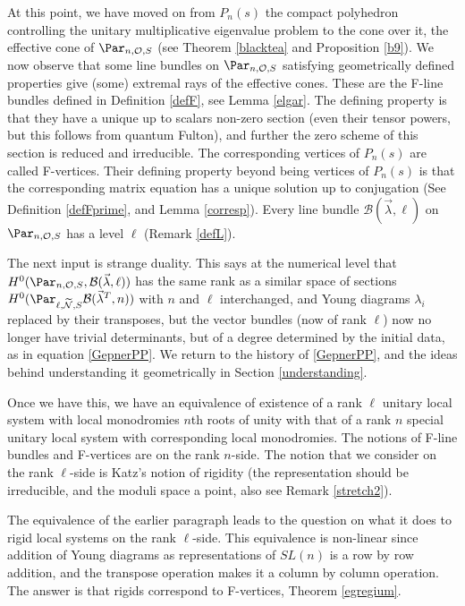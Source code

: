 At this point, we have moved on from $P_n(s)$ the compact polyhedron controlling the unitary multiplicative eigenvalue problem to the cone over it, the effective cone of $\Par_{n,\mathcal{O},S}$ (see Theorem \ref{blacktea} and Proposition \ref{b9}). We now observe that some line bundles on $\Par_{n,\mathcal{O},S}$ satisfying geometrically defined properties give (some) extremal rays of the effective cones. These are the  F-line bundles defined in Definition \ref{defF}, see Lemma \ref{elgar}. The defining property is that they have a unique up to scalars non-zero section (even their tensor powers, but this follows from quantum Fulton), and further the zero scheme of this section is reduced and irreducible. The corresponding vertices of $P_n(s)$ are called F-vertices. Their defining property beyond being vertices of $P_n(s)$ is that the corresponding matrix equation has a unique solution up to  conjugation (See Definition \ref{defFprime}, and Lemma \ref{corresp}). Every line bundle $\mathcal{B}(\vec{\lambda},\ell)$ on $\Par_{n,\mathcal{O},S}$ has a level $\ell$ (Remark \ref{defL}).

The next input is strange duality. This says at the numerical level that $H^0(\Par_{n,\mathcal{O},S},\mathcal{B}(\vec{\lambda},\ell))$ has the same rank as a similar space of sections $H^0(\Par_{\ell,\widetilde{\mathcal{N}},S}\mathcal{B}(\vec{\lambda}^T,n))$ with $n$ and $\ell$ interchanged, and Young diagrams $\lambda_i$ replaced by their transposes, but the vector bundles (now of rank $\ell$)  now no longer have trivial determinants, but of a degree determined by the initial data, as in equation \eqref{GepnerPP}. We return to the history of \eqref{GepnerPP}, and the ideas behind understanding it geometrically in Section \ref{understanding}.


Once we have this, we have an equivalence of existence of a rank $\ell$ unitary local system with local monodromies $n$th roots of unity with that of a rank $n$ special unitary local system with corresponding local monodromies. The notions of F-line bundles and F-vertices are on the rank $n$-side. The notion that we consider on the rank $\ell$-side is Katz's notion of rigidity (the  representation should be irreducible, and the moduli space a point, also see Remark \ref{stretch2}).

The equivalence of the earlier paragraph leads to the question on what it does to rigid local systems on the rank $\ell$-side. This equivalence is non-linear since addition of Young diagrams as representations of $SL(n)$ is a row by row addition, and the transpose operation makes it a column by column operation. The answer is that rigids correspond to F-vertices, Theorem \ref{egregium}. %

